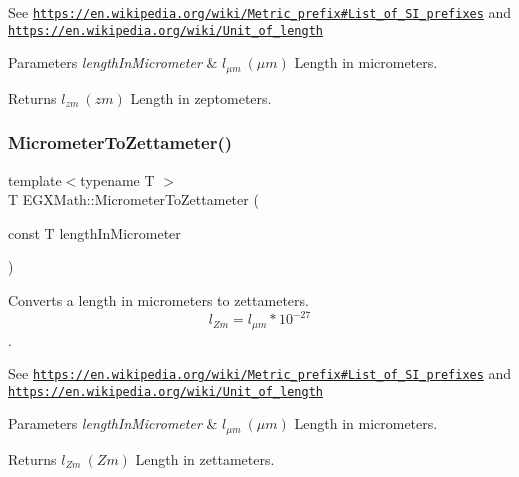 See \href{https://en.wikipedia.org/wiki/Metric_prefix#List_of_SI_prefixes}{\tt https\+://en.\+wikipedia.\+org/wiki/\+Metric\+\_\+prefix\#\+List\+\_\+of\+\_\+\+S\+I\+\_\+prefixes} and \href{https://en.wikipedia.org/wiki/Unit_of_length}{\tt https\+://en.\+wikipedia.\+org/wiki/\+Unit\+\_\+of\+\_\+length} 
\begin{DoxyParams}{Parameters}
{\em length\+In\+Micrometer} & $ l_{\mu m}\ (\mu m)$ Length in micrometers. \\
\hline
\end{DoxyParams}
\begin{DoxyReturn}{Returns}
$ l_{zm}\ (zm)$ Length in zeptometers. 
\end{DoxyReturn}
\mbox{\label{group___e_g_x_math-_conversions-_length_conversions-_micrometer-_s_i_ga689cb2982c4b1602ccee247011d017d8}} 
\subsubsection{\texorpdfstring{Micrometer\+To\+Zettameter()}{MicrometerToZettameter()}}
{\footnotesize\ttfamily template$<$typename T $>$ \\
T E\+G\+X\+Math\+::\+Micrometer\+To\+Zettameter (\begin{DoxyParamCaption}\item[{const T}]{length\+In\+Micrometer }\end{DoxyParamCaption})}



Converts a length in micrometers to zettameters. \[ l_{Zm}=l_{\mu m} * 10^{-27} \]. 

See \href{https://en.wikipedia.org/wiki/Metric_prefix#List_of_SI_prefixes}{\tt https\+://en.\+wikipedia.\+org/wiki/\+Metric\+\_\+prefix\#\+List\+\_\+of\+\_\+\+S\+I\+\_\+prefixes} and \href{https://en.wikipedia.org/wiki/Unit_of_length}{\tt https\+://en.\+wikipedia.\+org/wiki/\+Unit\+\_\+of\+\_\+length} 
\begin{DoxyParams}{Parameters}
{\em length\+In\+Micrometer} & $ l_{\mu m}\ (\mu m)$ Length in micrometers. \\
\hline
\end{DoxyParams}
\begin{DoxyReturn}{Returns}
$ l_{Zm}\ (Zm)$ Length in zettameters. 
\end{DoxyReturn}
